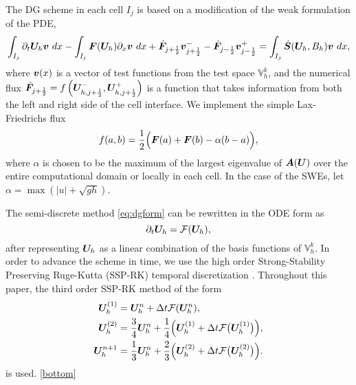 The DG scheme in each cell $I_j$ is based on a modification of the weak formulation of the PDE,
\begin{equation} \label{eq:dgform}
\int_{I_j}\partial_t \bm{U}_h \bm{v} \ dx 
- \int_{I_j} \bm{F}(\bm{U}_h) \partial_x {\bm{v}} \ dx 
+ \hat{\bm{F}}_{j+\frac{1}{2}}\bm{v}^-_{j+\frac{1}{2}}
-\hat{\bm{F}}_{j-\frac{1}{2}}\bm{v}^+_{j-\frac{1}{2}}
=\int_{I_j} \hat{\bm{S}}(\bm{U}_h,B_h) \bm{v} \ dx, 
\end{equation}
where $\bm{v}(x)$ is a vector of test functions from the test space $\mathbb{V}_{h}^k$, and the numerical flux 
$\hat{\bm{F}}_{j+\frac{1}{2}} = f\left(\bm{U}^-_{h,j+\frac{1}{2}}, \bm{U}^+_{h,j+\frac{1}{2}}\right)$ is a function that takes information from both the left and right side of the cell interface. We implement the simple Lax-Friedrichs flux
\begin{equation} \label{lfflux}
f(a,b)=\frac{1}{2}\Big(\bm{F}(a)+\bm{F}(b)-\alpha(b-a)\Big),
 \end{equation}
where $\alpha$ is chosen to be the maximum of the largest eigenvalue of $\bm{A}(\bm{U})$ over the entire computational domain or locally in each cell. In the case of the SWEs, let $\alpha = \max{(|u| + \sqrt{gh})}$.

The semi-discrete method \eqref{eq:dgform} can be rewritten in the ODE form as 
\begin{equation*}
    \partial_t \bm{U}_h = \mathcal{F}(\bm{U}_h),
\end{equation*}
after representing $\bm{U}_h$ as a linear combination of the basis functions of $\mathbb{V}^k_{h}$.
In order to advance the scheme in time, we use the high order Strong-Stability Preserving Ruge-Kutta (SSP-RK) temporal discretization \cite{Gottlieb2001StrongMethods}. Throughout this paper, the third order SSP-RK method of the form
\begin{equation} \label{rkscheme}
\begin{split}
\bm{U}_h^{(1)} & = \bm{U}_h^n + \Delta t \mathcal{F}(\bm{U}_h^n), \\
\bm{U}_h^{(2)} & = \frac{3}{4}\bm{U}_h^n + \frac{1}{4}\Big(\bm{U}_h^{(1)} + \Delta t \mathcal{F}\big(\bm{U}_h^{(1)}\big)\Big), \\
\bm{U}_h^{n+1} & = \frac{1}{3}\bm{U}_h^n + \frac{2}{3}\Big(\bm{U}_h^{(2)} + \Delta t \mathcal{F}\big(\bm{U}_h^{(2)}\big)\Big).
\end{split}
\end{equation}
is used.  \eqref{bottom} 



